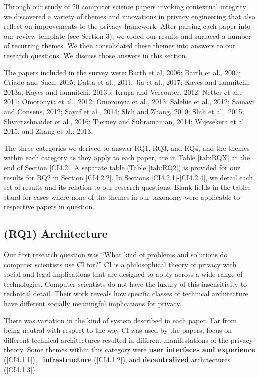 \documentclass[../thesis.tex]{subfiles}
\begin{document}
Through our study of 20 computer science papers invoking contextual
integrity we discovered a variety of themes and innovations in privacy
engineering that also reflect on improvements to the privacy framework.
After parsing each paper into our review template (see Section 3), we
coded our results and surfaced a number of recurring themes. We then
consolidated these themes into answers to our research questions. We
discuss those answers in this section.

The papers included in the survey were:
Barth et al, 2006; Barth et al., 2007;
Criado and Such, 2015; Datta et al., 2011; Jia et al., 2017; Kayes and
Iamnitchi, 2013a; Kayes and Iamnitchi,
2013b; Krupa and Vercouter,
2012; Netter et al.,
2011; Omoronyia et al.,
2012; Omoronyia et al.,
2013; Salehie et al.,
2012; Samavi and Consens,
2012; Sayaf et al.,
2014; Shih and Zhang,
2010; Shih et al., 2015; Shvartzshnaider
et al., 2016; Tierney and Subramanian,
2014; Wijesekera et al.,
2015; and Zhang et al.,
2013.

The three categories we derived to
answer RQ1, RQ3, and RQ4, and the themes within each category as they
apply to each paper, are in Table \ref{tab:RQX} at the end of Section \ref{CI4.2}. A
separate table (Table \ref{tab:RQ2}) is provided for our results for RQ2 in Section
\ref{CI4.2.2}. In Sections \ref{CI4.2.1}-\ref{CI4.2.4}, we detail each
set of results and its
relation to our research questions. Blank fields in the tables stand
for cases where none of the themes in our taxonomy were applicable to
respective papers in question.

\subsection{(RQ1) Architecture}
\label{CI4.1}

Our first research question was
``What kind of problems and solutions do computer
scientists use CI for?'' CI is a philosophical theory
of privacy with social and legal implications that are designed to
apply across a wide range of technologies. Computer scientists do not
have the luxury of this insensitivity to technical detail. Their work
reveals how specific classes of technical architecture have different
socially meaningful implications for privacy.

There was variation in the kind of system
described in each paper. Far from being neutral with respect to the way
CI was used by the papers, focus on different technical architectures
resulted in different manifestations of the privacy theory. Some
themes within this category were \textbf{user interfaces and experience
}(\ref{CI4.1.1}), \ \textbf{infrastructure }(\ref{CI4.1.2}),
and \textbf{decentralized} architectures (\ref{CI4.1.3}).
\end{document}
